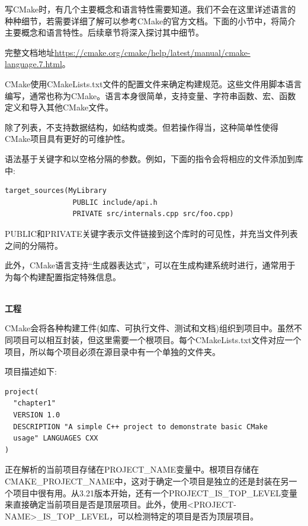
写CMake时，有几个主要概念和语言特性需要知道。我们不会在这里详述语言的种种细节，若需要详细了解可以参考CMake的官方文档。下面的小节中，将简介主要概念和语言特性。后续章节将深入探讨其中细节。

完整文档地址\url{https://cmake.org/cmake/help/latest/manual/cmake-language.7.html}。


CMake使用CMakeLists.txt文件的配置文件来确定构建规范。这些文件用脚本语言编写，通常也称为CMake。语言本身很简单，支持变量、字符串函数、宏、函数定义和导入其他CMake文件。

除了列表，不支持数据结构，如结构或类。但若操作得当，这种简单性使得CMake项目具有更好的可维护性。

语法基于关键字和以空格分隔的参数。例如，下面的指令会将相应的文件添加到库中:

\begin{lstlisting}[style=styleCMake]
target_sources(MyLibrary
                PUBLIC include/api.h
                PRIVATE src/internals.cpp src/foo.cpp)
\end{lstlisting}

PUBLIC和PRIVATE关键字表示文件链接到这个库时的可见性，并充当文件列表之间的分隔符。

此外，CMake语言支持“生成器表达式”，可以在生成构建系统时进行，通常用于为每个构建配置指定特殊信息。

\hspace*{\fill} \\ %
\noindent
\textbf{工程}

CMake会将各种构建工件(如库、可执行文件、测试和文档)组织到项目中。虽然不同项目可以相互封装，但这里需要一个根项目。每个CMakeLists.txt文件对应一个项目，所以每个项目必须在源目录中有一个单独的文件夹。

项目描述如下:

\begin{lstlisting}[style=styleCMake]
project(
  "chapter1"
  VERSION 1.0
  DESCRIPTION "A simple C++ project to demonstrate basic CMake
  usage" LANGUAGES CXX
)
\end{lstlisting}

正在解析的当前项目存储在PROJECT\_NAME变量中。根项目存储在CMAKE\_PROJECT\_NAME中，这对于确定一个项目是独立的还是封装在另一个项目中很有用。从3.21版本开始，还有一个PROJECT\_IS\_TOP\_LEVEL变量来直接确定当前项目是否是顶层项目。此外，使用<PROJECT-NAME>\_IS\_TOP\_LEVEL，可以检测特定的项目是否为顶层项目。

